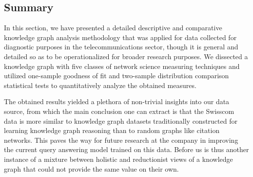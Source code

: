 \subsection{Summary}
\label{sec:summary}

In this section, we have presented a detailed descriptive and comparative knowledge graph analysis methodology that was applied for data collected for diagnostic purposes in the telecommunications sector, though it is general and detailed so as to be operationalized for broader research purposes. We dissected a knowledge graph with five classes of network science measuring techniques and utilized one-sample goodness of fit and two-sample distribution comparison statistical tests to quantitatively analyze the obtained measures.

The obtained results yielded a plethora of non-trivial insights into our data source, from which the main conclusion one can extract is that the Swisscom data is more similar to knowledge graph datasets traditionally constructed for learning knowledge graph reasoning than to random graphs like citation networks. This paves the way for future research at the company in improving the current query answering model trained on this data. Before us is thus another instance of a mixture between holistic and reductionist views of a knowledge graph that could not provide the same value on their own.
